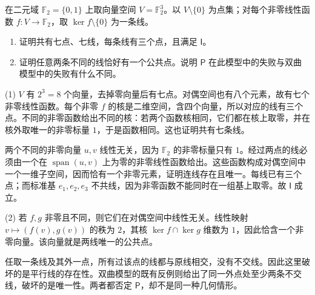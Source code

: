 \begin{exercise}
	\label{g1:ex:seven-point-incidence}
	在二元域 \(\mathbb F_2=\{0,1\}\) 上取向量空间 \(V=\mathbb F_2^3\)。以 \(V\setminus\{0\}\) 为点集；对每个非零线性函数 \(f:V\rightarrow\mathbb F_2\)，取 \(\ker f\setminus\{0\}\) 为一条线。
	\begin{enumerate}
		\item 证明共有七点、七线，每条线有三个点，且满足 \(\mathsf I\)。
		\item 证明任意两条不同的线恰好有一个公共点。说明 \(\mathsf P\) 在此模型中的失败与双曲模型中的失败有什么不同。
	\end{enumerate}
\end{exercise}
\begin{solution}
	(1) \(V\) 有 \(2^3=8\) 个向量，去掉零向量后有七点。对偶空间也有八个元素，故有七个非零线性函数。每个非零 \(f\) 的核是二维空间，含四个向量，所以对应的线有三个点。不同的非零函数给出不同的核：若两个函数核相同，它们都在核上取零，并在核外取唯一的非零标量 \(1\)，于是函数相同。这也证明共有七条线。

	两个不同的非零向量 \(u,v\) 线性无关，因为 \(\mathbb F_2\) 的非零标量只有 \(1\)。经过两点的线必须由一个在 \(\operatorname{span}(u,v)\) 上为零的非零线性函数给出。这些函数构成对偶空间中一个一维子空间，因而恰有一个非零元素，证明连线存在且唯一。每线已有三个点；而标准基 \(e_1,e_2,e_3\) 不共线，因为非零函数不能同时在一组基上取零。故 \(\mathsf I\) 成立。

	(2) 若 \(f,g\) 非零且不同，则它们在对偶空间中线性无关。线性映射 \(v\mapsto(f(v),g(v))\) 的秩为 \(2\)，其核 \(\ker f\cap\ker g\) 维数为 \(1\)，因此恰含一个非零向量。该向量就是两线唯一的公共点。

	任取一条线及其外一点，所有过该点的线都与原线相交，没有不交线。因此这里破坏的是平行线的存在性。双曲模型的既有反例则给出了同一外点处至少两条不交线，破坏的是唯一性。两者都否定 \(\mathsf P\)，却不是同一种几何情形。
\end{solution}

